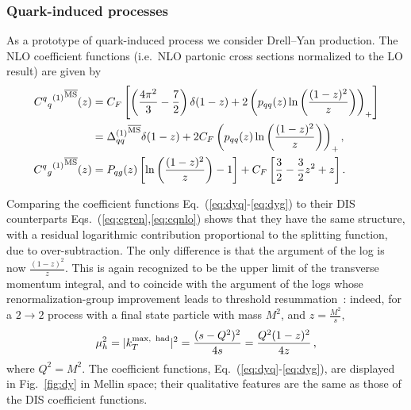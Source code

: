 \subsubsection{Quark-induced processes}
\label{sec:dy}
As a prototype of quark-induced process we consider Drell--Yan
production. The NLO coefficient functions (i.e.\ NLO partonic
cross sections normalized to the LO result) are given by 
\begin{align}\label{eq:dyq}
 {{C^q{}_q}^{(1)}}^{{\overline{\textrm{{MS}}}}}(z)&= C_F\left[
 \left(\frac{4\pi^2}{3} - \frac 7 2\right)\delta(1-z) + 2
 \left(p_{qq}(z) \ln\left(\frac{(1-z)^2}{z}\right)
 \right)_+\right]\nonumber  \\
 &={\Delta_{qq}^{(1)}}^{{\overline{\textrm{{MS}}}}}\delta(1-z) + 2 C_F \left(p_{qq}(z) \ln\left(\frac{(1-z)^2}{z}\right) \right)_+,\\
 \label{eq:dyg}
  {{C^q{}_g}^{(1)}}^{{\overline{\textrm{{MS}}}}}(z)&= P_{qg}(z) \left[ \ln\left(\frac{(1-z)^2}{z}\right) - 1 \right]
  + C_F\left[\frac 3 2 -  \frac 3 2 z^2 + z\right].
\end{align}


Comparing the coefficient functions
Eq.~(\ref{eq:dyq}-\ref{eq:dyg}) to their DIS counterparts
Eqs.~(\ref{eq:cgren},\ref{eq:cqnlo}) shows that they have the same
structure, with a residual logarithmic contribution proportional to
the splitting function, due to over-subtraction. The only difference is
that the argument of the log is now $\frac{(1-z)^2}{z}$. This is again
recognized to be the upper limit of the transverse momentum integral,
and to coincide with the argument of the logs whose
renormalization-group improvement leads to threshold
resummation~\cite{Forte:2002ni}: indeed,
for a $2\to2$ process with a final state particle with mass $M^2$, and
$z=\frac{M^2}{s}$,
\begin{equation}\label{eq:ktmaxh}
\mu_h^2=  |k_T^{\textrm{max,\, had}}|^2=\frac{(s-Q^2)^2}{4s}=\frac{Q^2(1-z)^2}{4z}\,,
\end{equation}
where $ Q^2 = M^2 $.
The coefficient
functions, Eq.~(\ref{eq:dyq}-\ref{eq:dyg}), are displayed in
Fig.~\ref{fig:dy} in Mellin space; their qualitative features are the
same as those of the DIS coefficient functions.

